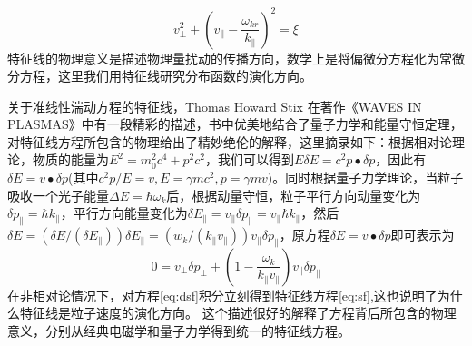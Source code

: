 \begin{equation}\label{eq:sf}
v_{\perp}^{2}+\left(v_{\|}-\frac{\omega_{k r}}{k_{\|}}\right)^{2}=\xi
\end{equation}
特征线的物理意义是描述物理量扰动的传播方向，数学上是将偏微分方程化为常微分方程\cite{RN2028}，这里我们用特征线研究分布函数的演化方向。
\par 关于准线性湍动方程的特征线，Thomas Howard Stix 在著作《WAVES IN PLASMAS》\cite{RN1836}中有一段精彩的描述，书中优美地结合了量子力学和能量守恒定理，对特征线方程所包含的物理给出了精妙绝伦的解释，这里摘录如下：根据相对论理论，物质的能量为$E^2=m_0^2 c^4+p^2 c^2$，我们可以得到$EδE=c^2 p∙δp$，因此有$δE=v∙δp$(其中$c^2 p/E=v,E=γmc^2,p=γmv) $。同时根据量子力学理论，当粒子吸收一个光子能量$ΔE=ℏω_k$后，根据动量守恒，粒子平行方向动量变化为$δp_{∥}=ℏk_{∥}$，平行方向能量变化为$δE_∥=v_∥ δp_∥=v_∥ ℏk_∥$，然后$δE=(δE/(δE_∥ ))δE_∥=(w_k/(k_∥ v_∥ )) v_∥ δp_∥$，原方程$δE=v∙δp$即可表示为
\begin{equation}\label{eq:dsf}
0=v_{\perp} \delta p_{\perp}+\left(1-\frac{\omega_{k}}{k_{\|} v_{\|}}\right) v_{\|} \delta p_{\|}
\end{equation}
在非相对论情况下，对方程\autoref{eq:dsf}积分立刻得到特征线方程\autoref{eq:sf},这也说明了为什么特征线是粒子速度的演化方向。
这个描述很好的解释了方程背后所包含的物理意义，分别从经典电磁学和量子力学得到统一的特征线方程。

